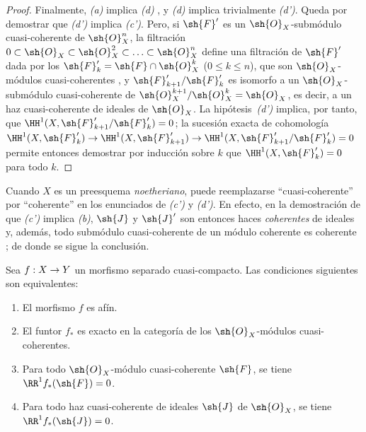 \documentclass[oneside,10pt]{amsart}
\makeatletter
\renewcommand{\leq}{\leqslant}
\newcommand{\ega@arrow}[2]{\mathchoice{#1}{#2}{#2}{#2}}
\renewcommand{\to}{\ega@arrow{\longrightarrow}{\rightarrow}}
\let\EGAOriginalLabel\label
\renewcommand{\label}[1]{\phantomsection\EGAOriginalLabel{#1}}
\makeatother
\begin{document}
\begin{proof}
Finalmente, \emph{(a)} implica \emph{(d)} , y \emph{(d)} implica trivialmente \emph{(d')}.
Queda por demostrar que \emph{(d')} implica \emph{(c')}.
Pero, si $\sh{F}'$ es un $\sh{O}_X$-submódulo cuasi-coherente de $\sh{O}_X^n$, la filtración $0\subset\sh{O}_X\subset\sh{O}_X^2\subset\ldots\subset\sh{O}_X^n$ define una filtración de $\sh{F}'$ dada por los $\sh{F}'_k=\sh{F}\cap\sh{O}_X^k$ ($0\leq k\leq n$), que son $\sh{O}_X$-módulos cuasi-coherentes , y $\sh{F}'_{k+1}/\sh{F}'_k$ es isomorfo a un $\sh{O}_X$-submódulo cuasi-coherente de $\sh{O}_X^{k+1}/\sh{O}_X^k=\sh{O}_X$, es decir, a un haz cuasi-coherente de ideales de $\sh{O}_X$.
La hipótesis~\emph{(d')} implica, por tanto, que $\HH^1(X,\sh{F}'_{k+1}/\sh{F}'_k)=0$;
la sucesión exacta de cohomología $\HH^1(X,\sh{F}'_k)\to\HH^1(X,\sh{F}'_{k+1})\to\HH^1(X,\sh{F}'_{k+1}/\sh{F}'_k)=0$ permite entonces demostrar por inducción sobre $k$ que $\HH^1(X,\sh{F}'_k)=0$ para todo $k$.
\end{proof}

\begin{remark}[5.2.1.1]
\label{II.5.2.1.1}
Cuando $X$ es un preesquema \emph{noetheriano}, puede reemplazarse ``cuasi-coherente'' por ``coherente'' en los enunciados de \emph{(c')} y \emph{(d')}.
En efecto, en la demostración de que \emph{(c')} implica \emph{(b)}, $\sh{J}$ y $\sh{J}'$ son entonces haces \emph{coherentes} de ideales y, además, todo submódulo cuasi-coherente de un módulo coherente es coherente ;
de donde se sigue la conclusión.
\end{remark}

\begin{corollary}[5.2.2]
\label{II.5.2.2}
Sea $f:X\to Y$ un morfismo separado cuasi-compacto.
Las condiciones siguientes son equivalentes:
\begin{enumerate}
  \item[{\rm(a)}] El morfismo $f$ es afín.
  \item[{\rm(b)}] El funtor $f_*$ es exacto en la categoría de los $\sh{O}_X$-módulos cuasi-coherentes.
  \item[{\rm(c)}] Para todo $\sh{O}_X$-módulo cuasi-coherente $\sh{F}$, se tiene $\RR^1f_*(\sh{F})=0$.
  \item[{\rm(c')}] Para todo haz cuasi-coherente de ideales $\sh{J}$ de $\sh{O}_X$, se tiene $\RR^1f_*(\sh{J})=0$.
\end{enumerate}
\end{corollary}
\end{document}
